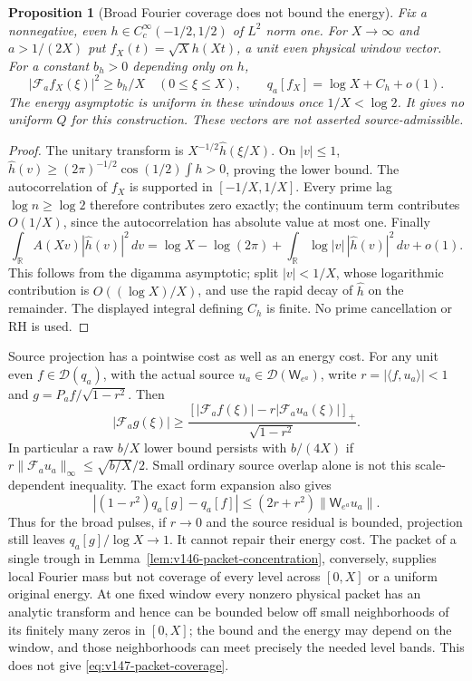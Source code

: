 \documentclass[11pt]{article}
\newtheorem{proposition}[theorem]{Proposition}
\theoremstyle{remark}
\begin{document}
\begin{proposition}[Broad Fourier coverage does not bound the energy]
\label{prop:v147-broad-packet}
Fix a nonnegative, even $h\in C_c^\infty(-1/2,1/2)$ of $L^2$ norm
one. For $X\to\infty$ and $a>1/(2X)$ put
$f_X(t)=\sqrt X h(Xt)$, a unit even physical window vector. For a
constant $b_h>0$ depending only on $h$,
\begin{equation}\label{eq:v147-broad-packet}
 |\mathcal F_af_X(\xi)|^2\ge b_h/X\quad(0\le\xi\le X),
 \qquad q_a[f_X]=\log X+C_h+o(1).
\end{equation}
The energy asymptotic is uniform in these windows once
$1/X<\log2$. It gives no uniform $Q$ for this construction.
These vectors are not asserted source-admissible.
\end{proposition}
\begin{proof}
The unitary transform is $X^{-1/2}\widehat h(\xi/X)$. On $|v|\le1$,
$\widehat h(v)\ge(2\pi)^{-1/2}\cos(1/2)\int h>0$, proving the
lower bound. The autocorrelation of $f_X$ is supported in
$[-1/X,1/X]$. Every prime lag $\log n\ge\log2$ therefore contributes
zero exactly; the continuum term contributes $O(1/X)$, since the
autocorrelation has absolute value at most one. Finally
\[
 \int_{\mathbb R}A(Xv)|\widehat h(v)|^2\,dv
 =\log X-\log(2\pi)
       +\int_{\mathbb R}\log|v|\,|\widehat h(v)|^2\,dv+o(1).
\]
This follows from the digamma asymptotic; split $|v|<1/X$, whose
logarithmic contribution is $O((\log X)/X)$, and use the rapid decay
of $\widehat h$ on the remainder. The displayed integral defining
$C_h$ is finite. No prime cancellation or RH is used.
\end{proof}

Source projection has a pointwise cost as well as an energy cost. For
any unit even $f\in\mathcal D(q_a)$, with the actual source
$u_a\in\mathcal D(\mathsf W_{e^a})$, write $r=|\langle f,u_a\rangle|<1$ and
$g=P_af/\sqrt{1-r^2}$. Then
\begin{equation}\label{eq:v147-projected-density}
 |\mathcal F_ag(\xi)|\ge
 \frac{[|\mathcal F_af(\xi)|-r|\mathcal F_au_a(\xi)|]_+}
      {\sqrt{1-r^2}}.
\end{equation}
In particular a raw $b/X$ lower bound persists with $b/(4X)$ if
$r\|\mathcal F_au_a\|_\infty\le\sqrt{b/X}/2$. Small ordinary
source overlap alone is not this scale-dependent inequality.
The exact form expansion also gives
\[
 \left|(1-r^2)q_a[g]-q_a[f]\right|
 \le(2r+r^2)\|\mathsf W_{e^a}u_a\|.
\]
Thus for the broad pulses, if $r\to0$ and the source residual is
bounded, projection still leaves $q_a[g]/\log X\to1$.
It cannot repair their energy cost. The packet of a single trough in
Lemma~\ref{lem:v146-packet-concentration}, conversely, supplies local
Fourier mass but not coverage of every level across $[0,X]$ or a
uniform original energy. At one fixed window every nonzero physical
packet has an analytic transform and hence can be bounded below off
small neighborhoods of its finitely many zeros in $[0,X]$; the bound
and the energy may depend on the window, and those neighborhoods
can meet precisely the needed level bands. This does not give
\eqref{eq:v147-packet-coverage}.
\end{document}
